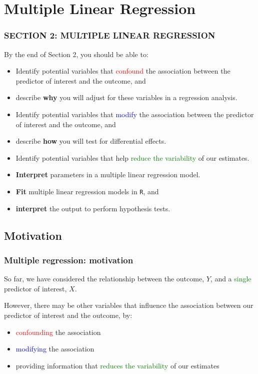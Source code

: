 \documentclass[12pt, 
hyperref={colorlinks=true, linkcolor=blue, urlcolor=cyan},dvipsnames]{beamer}
\begin{document}
\section{Multiple Linear Regression}
\begin{frame}
\frametitle{SECTION 2: MULTIPLE LINEAR REGRESSION}
By the end of Section 2, you should be able to: \vspace{-0.4cm}
\begin{itemize}
\item Identify potential variables that \textcolor{red}{confound} the association between the predictor of interest and the outcome, and
\item describe \textbf{why} you will adjust for these variables in a regression analysis.
\item Identify potential variables that \textcolor{blue}{modify} the association between the predictor of interest and the outcome, and  
\item describe \textbf{how} you will test for  differential effects.
\item Identify potential variables that help \textcolor{green}{reduce the variability} of our estimates.
\item \textbf{Interpret} parameters in a multiple linear regression model.
\item \textbf{Fit} multiple linear regression models in \texttt{R}, and
\item \textbf{interpret} the output to perform hypothesis tests.
\end{itemize}

\end{frame}

\subsection{Motivation}
\begin{frame}
\frametitle{Multiple regression: motivation}

So far, we have considered the relationship between the outcome, $Y$, and a \textcolor{green}{single} predictor of interest, $X$.

However, there may be other variables that influence the association between our predictor of interest and the outcome, by:
\begin{itemize}
\item \textcolor{red}{confounding} the association 
\item \textcolor{blue}{modifying} the association
\item providing information that \textcolor{green}{reduces the variability} of our estimates
\end{itemize} 
\end{frame}
\end{document}
